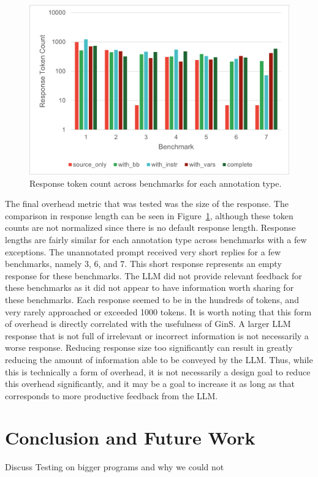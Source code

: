 \documentclass[sigconf]{acmart}
\begin{document}
\begin{figure}
    \centering
    \includegraphics[width=1\linewidth]{images/ResponseCost.png}
    \caption{Response token count across benchmarks for each annotation type.}
    \label{fig:response}
\end{figure}

The final overhead metric that was tested was the size of the response.
The comparison in response length can be seen in Figure~\ref{fig:response}, although these token counts are not normalized since there is no default response length.
Response lengths are fairly similar for each annotation type across benchmarks with a few exceptions.
The unannotated prompt received very short replies for a few benchmarks, namely 3, 6, and 7.
This short response represents an empty response for these benchmarks.
The LLM did not provide relevant feedback for these benchmarks as it did not appear to have information worth sharing for these benchmarks.
Each response seemed to be in the hundreds of tokens, and very rarely approached or exceeded 1000 tokens.
It is worth noting that this form of overhead is directly correlated with the usefulness of GinS.
A larger LLM response that is not full of irrelevant or incorrect information is not necessarily a worse response.
Reducing response size too significantly can result in greatly reducing the amount of information able to be conveyed by the LLM.
Thus, while this is technically a form of overhead, it is not necessarily a design goal to reduce this overhead significantly, and it may be a goal to increase it as long as that corresponds to more productive feedback from the LLM.


\section{Conclusion and Future Work}
Discuss Testing on bigger programs and why we could not




\end{document}
